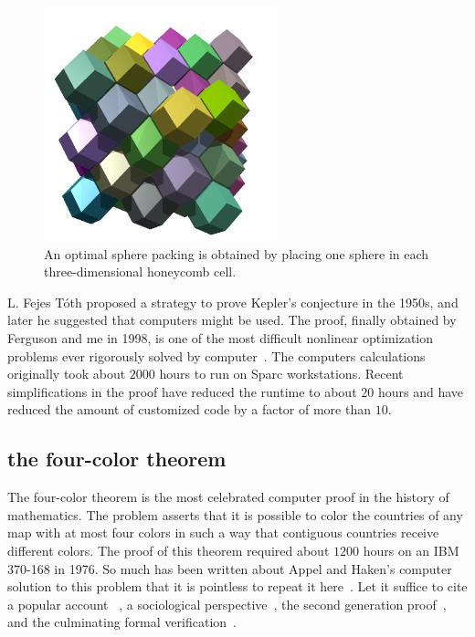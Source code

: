 \documentclass{llncs}
\begin{document}
\begin{figure}[h!]
  \centering
\includegraphics[scale=0.5]{Rhombic_dodecahedra.jpg}
  \caption{An optimal sphere packing is obtained by placing
one sphere in each three-dimensional honeycomb cell.}
\label{fig:rhombic}
\end{figure}

L. Fejes T\'oth proposed a strategy to prove Kepler's conjecture in
the 1950s, and later he suggested that computers might be used.  The
proof, finally obtained by Ferguson and me in 1998, is one of the
most difficult nonlinear optimization problems ever rigorously solved
by computer~\cite{Hales:2005:Annals}.  The computers calculations
originally took about $2000$ hours to run on Sparc workstations.
Recent simplifications in the proof have reduced the runtime to about
$20$ hours and have reduced the amount of customized code by a factor
of more than $10$.


\subsection{the four-color theorem}

The four-color theorem is the most celebrated computer proof in the
history of mathematics.  The problem asserts that it is possible to
color the countries of any map with at most four colors in such a way
that contiguous countries receive different colors.  The proof of this
theorem required about $1200$ hours on an IBM 370-168 in 1976. So much has
been written about Appel and Haken's computer solution to this problem
that it is pointless to repeat it here~\cite{AH4CT}.  Let it
suffice to cite a popular account ~\cite{Wil4CT}, a sociological
perspective~\cite{Mac}, the second generation
proof~\cite{Robertson:1997:JCTB}, and the culminating formal
verification~\cite{gonthier:2008:formal}.
\end{document}
